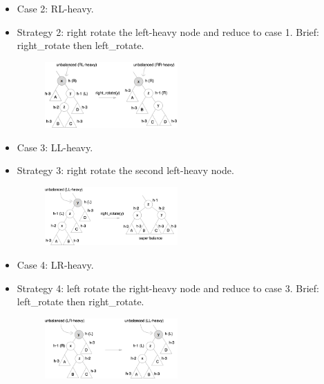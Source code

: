 \documentclass[twocolumn]{article}
\begin{document}
\begin{itemize}
\begin{itemize}
  \item Case 2: RL-heavy.
  \item Strategy 2: right rotate the left-heavy node and reduce to case 1. Brief: right\_rotate then left\_rotate.
    \begin{figure}[H]
    \centering
    \includegraphics[width=0.48\textwidth]{assets/avl-rl}
    \end{figure}
  
  \item Case 3: LL-heavy.
  \item Strategy 3: right rotate the second left-heavy node.
    \begin{figure}[H]
    \centering
    \includegraphics[width=0.48\textwidth]{assets/avl-ll}
    \end{figure}
  
  \item Case 4: LR-heavy.
  \item Strategy 4: left rotate the right-heavy node and reduce to case 3. Brief: left\_rotate then right\_rotate.
    \begin{figure}[H]
    \centering
    \includegraphics[width=0.48\textwidth]{assets/avl-lr}
    \end{figure}
  \end{itemize}


\end{itemize}
\end{document}
